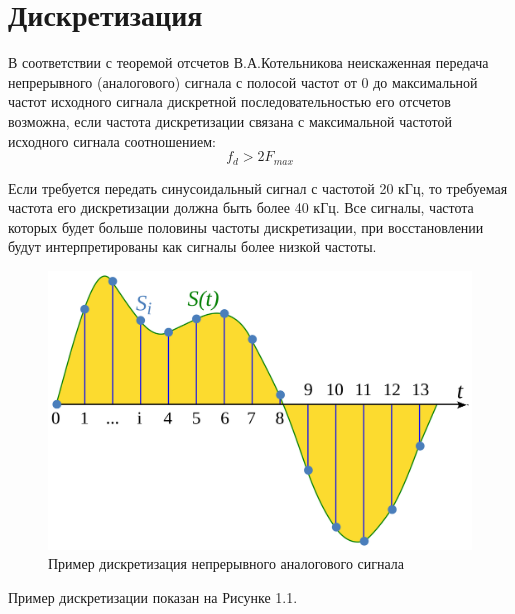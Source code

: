 \documentclass[12pt,a4paper,oneside]{report}
\begin{document}
\section{Дискретизация}
В соответствии с теоремой отсчетов В.А.Котельникова неискаженная передача непрерывного (аналогового) сигнала с полосой частот от 0 до максимальной частот исходного сигнала дискретной последовательностью его отсчетов возможна, если частота дискретизации связана с максимальной частотой исходного сигнала соотношением\cite{one}:
\begin{equation}
	f_d > 2F_{max}
	\label{eq:ref}
\end{equation}

Если требуется передать синусоидальный сигнал с частотой 20 кГц, то требуемая частота его дискретизации должна быть более 40 кГц. Все сигналы, частота которых будет больше половины частоты дискретизации, при восстановлении будут интерпретированы как сигналы более низкой частоты.

\begin{figure}[!htbp]
	\centering
	\includegraphics[scale=0.15]{discreth.png}
	\caption{Пример дискретизация непрерывного аналогового сигнала}
	\label{ris:discreth}
\end{figure}

Пример дискретизации показан на Рисунке 1.1.
\end{document}

